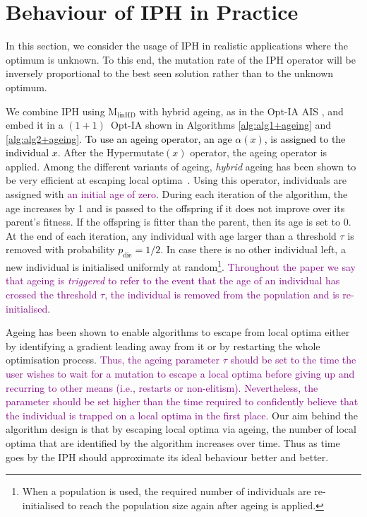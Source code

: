 \documentclass[lettersize,journal]{IEEEtran}
\newcommand{\new}[1]{\textcolor{black}{#1}}
\newcommand{\rev}[1]{\textcolor{black}{#1}}
\newcommand{\rerev}[1]{\textcolor{purple}{#1}}
\newcommand{\linHD}{M$_{\text{linHD}}$}
\newcommand{\IPHfcm}{IPH}
\begin{document}
 	
 	\section{Behaviour of IPH in Practice}

In this section, we consider the usage of IPH in realistic applications where the optimum is unknown.
 To this end, the mutation rate of the IPH operator will be inversely proportional to the best seen solution rather than to the unknown optimum. 
 
 We combine \IPHfcm{} using {\linHD } with hybrid ageing, as in the Opt-IA AIS \cite{CutelloNicosiaPavoneTimmis2007}, and embed it in a $(1+1)$~Opt-IA shown in Algorithms \ref{alg:alg1+ageing} and \ref{alg:alg2+ageing}. \new{To use \rev{an} ageing operator, an age $\alpha(x)$, is assigned to the individual $x$.} After the Hypermutate$(x)$ operator, the ageing operator is applied.
 	Among the different variants of ageing, {\it hybrid} ageing has been shown to be very efficient at escaping local optima~\cite{OlivetoSudholt2014ageing,CorusOlivetoYazdani2019TCS,CorusOlivetoYazdaniFASTAIS2018,CorusOlivetoYazdaniPPSN2018Approx}. Using this operator,  individuals are assigned with \rerev{an initial age of zero}. During each iteration of the algorithm, the age  increases by 1 and is passed to the offspring if it does not improve over its parent's fitness. If the offspring is fitter than the parent, then its age is set to 0. At the end of each iteration, any individual with age larger than a threshold $\tau$ is removed with probability \rev{$p_{\text{die}}=1/2$}. In case there is no other individual left, a new individual is initialised uniformly at random\footnote{When a population is used, the required number of individuals are re-initialised to reach the population size again after ageing is applied.}. \rerev{Throughout the paper we say that ageing is {\it triggered} to refer to the event that the age of an individual has crossed the threshold $\tau$, the individual is removed from the population and is re-initialised}.
 
 Ageing has been shown to enable algorithms to escape from local optima either by identifying a gradient leading away from it or by restarting the whole optimisation process. 
 \rerev{Thus, the ageing parameter $\tau$ should be set to the time the user wishes to wait for a mutation to escape a local optima before giving up and recurring to other means (i.e., restarts or non-elitism). Nevertheless, the parameter should be set higher than the time required to confidently believe that the individual is trapped on a local optima in the first place.} 
 Our aim behind the algorithm design is that by escaping local optima via ageing, the number of local optima that are identified by the algorithm increases over time. Thus as time goes by the IPH should approximate its ideal behaviour better and better.
 
\end{document}
